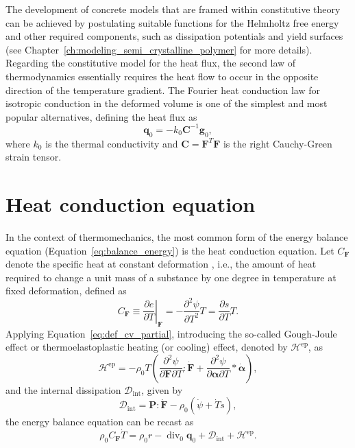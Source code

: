 The development of concrete models that are framed within constitutive theory can be achieved by postulating suitable functions for the  Helmholtz free energy and other required components, such as dissipation potentials and yield surfaces (see Chapter~\ref{ch:modeling_semi_crystalline_polymer} for more details).
Regarding the constitutive model for the heat flux, the second law of thermodynamics essentially requires the heat flow to occur in the opposite direction of the temperature gradient.
The Fourier heat conduction law for isotropic conduction in the deformed volume is one of the simplest and most popular alternatives, defining the heat flux as
\begin{equation}
  \bm{q}_0 = - k_0 \bm{C}^{-1} \bm{g}_0,
\end{equation}
where \(k_0\) is the thermal conductivity and \(\bm{C} = \bm{F}^T \bm{F}\) is the right Cauchy-Green strain tensor.


\section{Heat conduction equation}
\label{sec:heat-cond-equat}

In the context of thermomechanics, the most common form of the energy balance equation (Equation~\eqref{eq:balance_energy}) is the heat conduction equation.
Let \(C_{\bm F}\) denote the specific heat at constant deformation , i.e., the amount of heat required to change a unit mass of a substance by one degree in temperature at fixed deformation, defined as
\begin{equation} \label{eq:def_cv_partial}
  C_{\bm F}\equiv \left.\frac{\partial e}{\partial T}\right|_{\bm F}=-\frac{\partial^{2} \psi}{\partial T^{2}} T=\frac{\partial s}{\partial T} T.
\end{equation}
Applying Equation~\eqref{eq:def_cv_partial}, introducing the so-called Gough-Joule effect or thermoelastoplastic heating (or cooling) effect, denoted by \(\mathcal H^\text{ep}\), as
\begin{equation}
  \label{eq:def_gough_joule_effect}
  \mathcal H^\text{ep} = - \rho_0T\left(\frac{\partial^2 \psi}{\partial \bm{F}\partial T}: \dot{\bm{F}} + \frac{\partial^2 \psi}{\partial \bm{\alpha} \partial T}*\dot{\bm{\alpha}} \right),
\end{equation}
and the internal dissipation \(\mathcal D_\text{int}\), given by
\begin{equation}
  \mathcal D_\text{int} = \bm{P}:\dot{\bm{F}} - \rho_0(\dot \psi + \dot T s),
\end{equation}
the energy balance equation can be recast as
\begin{equation}
  \label{eq:heat_conduction}
  \rho_0 C_{\bm F} \dot T = \rho_0 r - \operatorname{div}_0 \bm{q}_0 + \mathcal D_\text{int} + \mathcal H^\text{ep}.
\end{equation}

